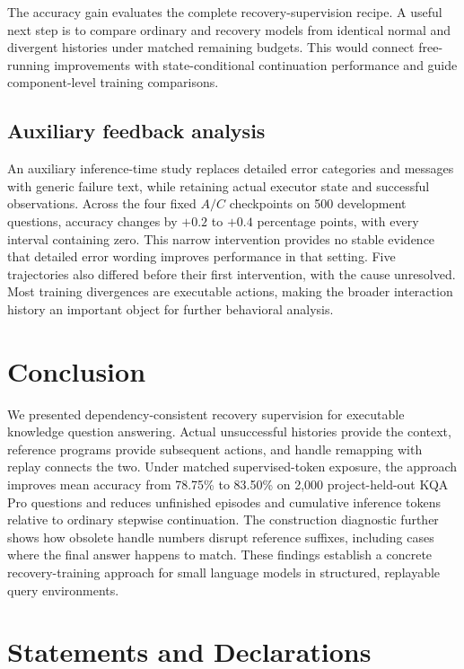 \documentclass[a4paper,12pt]{article}
\begin{document}
The accuracy gain evaluates the complete recovery-supervision recipe. A useful next step is to compare ordinary and recovery models from identical normal and divergent histories under matched remaining budgets. This would connect free-running improvements with state-conditional continuation performance and guide component-level training comparisons.

\subsection{Auxiliary feedback analysis}

An auxiliary inference-time study replaces detailed error categories and messages with generic failure text, while retaining actual executor state and successful observations. Across the four fixed $A/C$ checkpoints on 500 development questions, accuracy changes by $+0.2$ to $+0.4$ percentage points, with every interval containing zero. This narrow intervention provides no stable evidence that detailed error wording improves performance in that setting. Five trajectories also differed before their first intervention, with the cause unresolved. Most training divergences are executable actions, making the broader interaction history an important object for further behavioral analysis.

\section{Conclusion}

We presented dependency-consistent recovery supervision for executable knowledge question answering. Actual unsuccessful histories provide the context, reference programs provide subsequent actions, and handle remapping with replay connects the two. Under matched supervised-token exposure, the approach improves mean accuracy from 78.75\% to 83.50\% on 2,000 project-held-out KQA Pro questions and reduces unfinished episodes and cumulative inference tokens relative to ordinary stepwise continuation. The construction diagnostic further shows how obsolete handle numbers disrupt reference suffixes, including cases where the final answer happens to match. These findings establish a concrete recovery-training approach for small language models in structured, replayable query environments.

\section*{Statements and Declarations}
\end{document}

